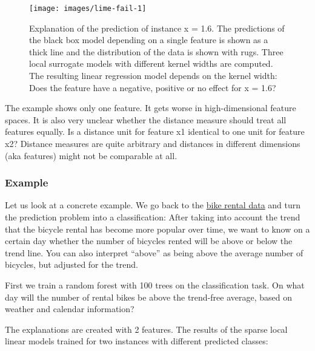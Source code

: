 \documentclass[
  12pt,
]{krantz}
\begin{document}
\begin{figure}

{\centering \texttt{[image: images/lime-fail-1]} 

}

\caption{Explanation of the prediction of instance x = 1.6. The predictions of the black box model depending on a single feature is shown as a thick line and the distribution of the data is shown with rugs. Three local surrogate models with different kernel widths are computed. The resulting linear regression model depends on the kernel width: Does the feature have a negative, positive or no effect for x = 1.6?}\label{fig:lime-fail}
\end{figure}

The example shows only one feature.
It gets worse in high-dimensional feature spaces.
It is also very unclear whether the distance measure should treat all features equally.
Is a distance unit for feature x1 identical to one unit for feature x2?
Distance measures are quite arbitrary and distances in different dimensions (aka features) might not be comparable at all.

\hypertarget{example-5}{%
\subsubsection{Example}\label{example-5}}

Let us look at a concrete example.
We go back to the \protect\hyperlink{bike-data}{bike rental data} and turn the prediction problem into a classification:
After taking into account the trend that the bicycle rental has become more popular over time, we want to know on a certain day whether the number of bicycles rented will be above or below the trend line.
You can also interpret ``above'' as being above the average number of bicycles, but adjusted for the trend.

First we train a random forest with 100 trees on the classification task.
On what day will the number of rental bikes be above the trend-free average, based on weather and calendar information?

The explanations are created with 2 features.
The results of the sparse local linear models trained for two instances with different predicted classes:
\end{document}
